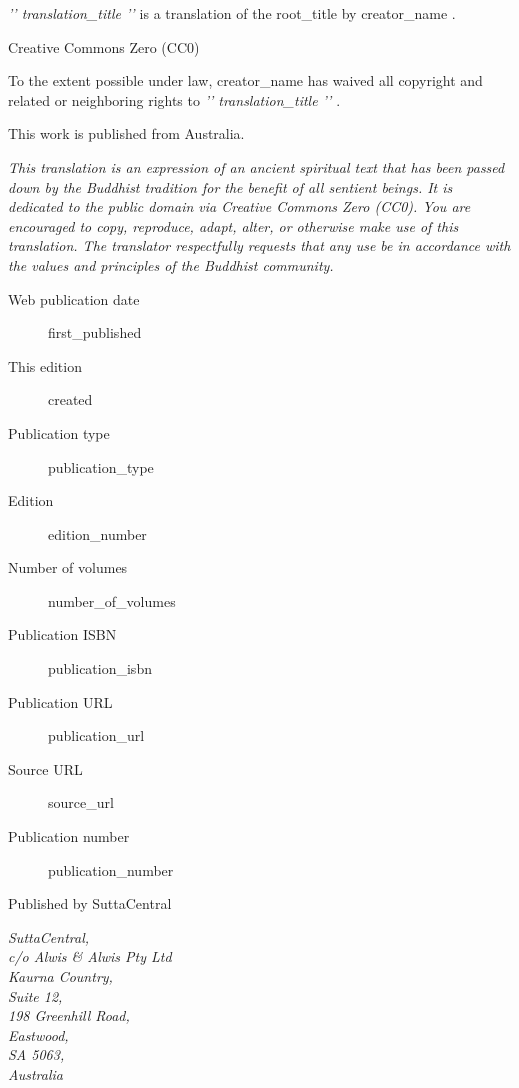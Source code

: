 
\begin{footnotesize}

\textit{{ '{' }}{{ translation_title }}{{ '}' }} is a translation of the {{ root_title }} by {{ creator_name }}.

\medskip

Creative Commons Zero (CC0)

To the extent possible under law, {{ creator_name }} has waived all copyright and related or neighboring rights to \textit{{ '{' }}{{ translation_title }}{{ '}' }}.

\medskip

This work is published from Australia.

\begin{center}
\textit{This translation is an expression of an ancient spiritual text that has been passed down by the Buddhist tradition for the benefit of all sentient beings. It is dedicated to the public domain via Creative Commons Zero (CC0). You are encouraged to copy, reproduce, adapt, alter, or otherwise make use of this translation. The translator respectfully requests that any use be in accordance with the values and principles of the Buddhist community.}
\end{center}

\medskip

\begin{description}
    \item[Web publication date] {{ first_published }}
    \item[This edition] {{ created }}
    \item[Publication type] {{ publication_type }}
    \item[Edition] {{ edition_number }}
    \item[Number of volumes] {{ number_of_volumes }}
    \item[Publication ISBN] {{ publication_isbn }}
    \item[Publication URL] {{ publication_url }}
    \item[Source URL] {{ source_url }}
    \item[Publication number] {{ publication_number }}
\end{description}

\medskip

Published by SuttaCentral

\medskip

\textit{SuttaCentral,\\
c/o Alwis \& Alwis Pty Ltd\\
Kaurna Country,\\
Suite 12,\\
198 Greenhill Road,\\
Eastwood,\\
SA 5063,\\
Australia}

\end{footnotesize}

\newpage
